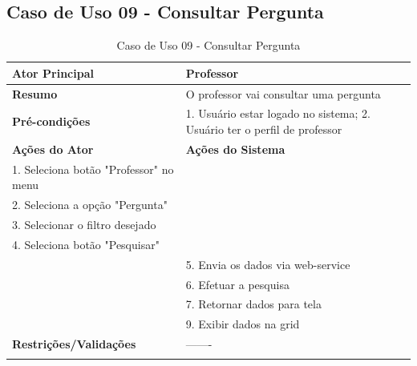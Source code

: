 \subsection{Caso de Uso 09 - Consultar Pergunta}
\label{sc:case9}
\begin{center}
\begin{longtable}{p{8cm}|p{8cm}}
    \hline
    \textbf{Ator Principal} & Professor \\
    \hline
    \textbf{Resumo} & O professor vai consultar uma pergunta \\
    \hline
    \textbf{Pr\'{e}-condi\c{c}\~{o}es} & 1. Usuário estar logado no sistema; 2. Usuário ter o perfil de professor \\
    \hline
    \textbf{A\c{c}\~{o}es do Ator} & \textbf{A\c{c}\~{o}es do Sistema} \\
    \hline
    1. Seleciona botão "Professor" no menu \\
    \hline
    2. Seleciona a opção "Pergunta" \\
	\hline
    3. Selecionar o filtro desejado \\
	\hline
    4. Seleciona botão "Pesquisar" \\
    \hline
    & 5. Envia os dados via web-service \\
	\hline
    & 6. Efetuar a pesquisa \\
	\hline
    & 7. Retornar dados para tela \\
	\hline
    & 9. Exibir dados na grid \\
    \hline
    \hline
    \textbf{Restri\c{c}\~{o}es/Valida\c{c}\~{o}es} & -------\\
\hline
\caption{Caso de Uso 09 - Consultar Pergunta}
\end{longtable}
\end{center}

